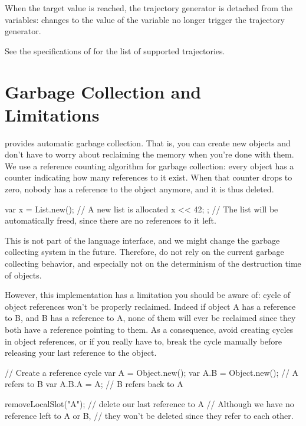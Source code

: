 
When the target value is reached, the trajectory generator is detached
from the variables: changes to the value of the variable no longer
trigger the trajectory generator.


See the specifications of  for the list
of supported trajectories.

\section{Garbage Collection and Limitations}
\label{sec:lang:gc}

\us provides automatic garbage collection. That is, you can create new
objects and don't have to worry about reclaiming the memory when you're done
with them. We use a reference counting algorithm for garbage collection:
every object has a counter indicating how many references to it exist. When
that counter drops to zero, nobody has a reference to the object anymore,
and it is thus deleted.

\begin{urbiunchecked}
{
  var x = List.new(); // A new list is allocated
  x << 42;
};
// The list will be automatically freed, since there are no references to it left.
\end{urbiunchecked}

This is not part of the language interface, and we might change the garbage
collecting system in the future. Therefore, do not rely on the current
garbage collecting behavior, and especially not on the determinism of the
destruction time of objects.

However, this implementation has a limitation you should be aware of: cycle
of object references won't be properly reclaimed. Indeed if object A has a
reference to B, and B has a reference to A, none of them will ever be
reclaimed since they both have a reference pointing to them. As a
consequence, avoid creating cycles in object references, or if you really
have to, break the cycle manually before releasing your last reference to
the object.

\begin{urbiunchecked}
// Create a reference cycle
var A = Object.new();
var A.B = Object.new(); // A refers to B
var A.B.A = A; // B refers back to A

removeLocalSlot("A"); // delete our last reference to A
// Although we have no reference left to A or B,
// they won't be deleted since they refer to each other.
\end{urbiunchecked}

